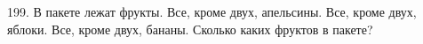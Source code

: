 199. В пакете лежат фрукты. Все, кроме двух, апельсины. Все, кроме двух, яблоки. Все, кроме двух, бананы. Сколько каких фруктов в пакете?\\
